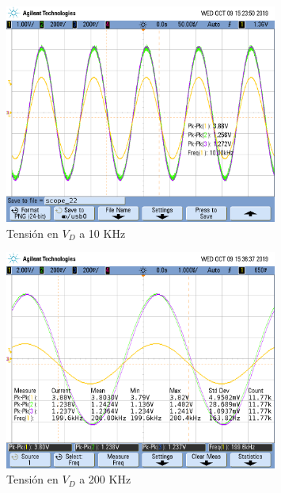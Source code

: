 \begin{figure}[H]
\centering
\includegraphics[width=0.8\textwidth,trim={0.25cm 5cm  1 5cm},clip]{Mediciones/Tensiones_10_KHz}
\caption{Tensión en $V_D$ a 10 KHz}
\label{fig:Tensiones_10_KHz}
\end{figure}

\begin{figure}[H]
\centering
\includegraphics[width=0.8\textwidth,trim={0.25cm 5cm  1 5cm},clip]{Mediciones/Tensiones_200_KHz}
\caption{Tensión en $V_D$ a 200 KHz}
\label{fig:Tensiones_200_KHz}
\end{figure}



